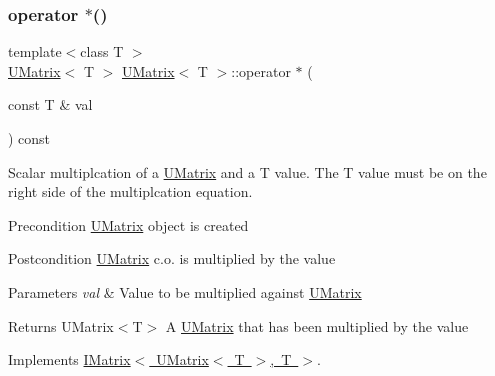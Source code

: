 \mbox{\label{class_u_matrix_a7b1875cfc49b374875dac2a58948f3ac}} 
\subsubsection{\texorpdfstring{operator $\ast$()}{operator *()}}
{\footnotesize\ttfamily template$<$class T $>$ \\
\mbox{\hyperlink{class_u_matrix}{U\+Matrix}}$<$ T $>$ \mbox{\hyperlink{class_u_matrix}{U\+Matrix}}$<$ T $>$\+::operator $\ast$ (\begin{DoxyParamCaption}\item[{const T \&}]{val }\end{DoxyParamCaption}) const\hspace{0.3cm}{\ttfamily [virtual]}}



Scalar multiplcation of a \mbox{\hyperlink{class_u_matrix}{U\+Matrix}} and a T value. The T value must be on the right side of the multiplcation equation. 

\begin{DoxyPrecond}{Precondition}
\mbox{\hyperlink{class_u_matrix}{U\+Matrix}} object is created 
\end{DoxyPrecond}
\begin{DoxyPostcond}{Postcondition}
\mbox{\hyperlink{class_u_matrix}{U\+Matrix}} c.\+o. is multiplied by the value 
\end{DoxyPostcond}

\begin{DoxyParams}{Parameters}
{\em val} & Value to be multiplied against \mbox{\hyperlink{class_u_matrix}{U\+Matrix}} \\
\hline
\end{DoxyParams}
\begin{DoxyReturn}{Returns}
U\+Matrix$<$\+T$>$ A \mbox{\hyperlink{class_u_matrix}{U\+Matrix}} that has been multiplied by the value 
\end{DoxyReturn}


Implements \mbox{\hyperlink{class_i_matrix_a10121e038635bdf33552c6a1fb288398}{I\+Matrix$<$ U\+Matrix$<$ T $>$, T $>$}}.

\mbox{\label{class_u_matrix_a06c554ab9d6deb7d1950cdd49eb089e0}} 

